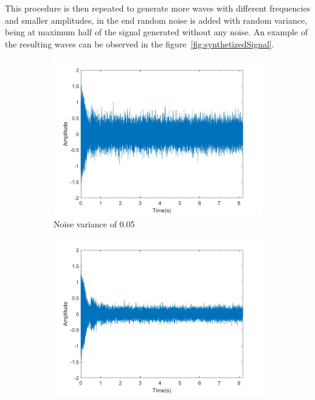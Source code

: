 This procedure is then repeated to generate more waves with different frequencies and smaller amplitudes, in the end random noise is added with random variance, being at maximum half of the signal generated without any noise. An example of the resulting waves can be observed in the figure~\ref{fig:synthetizedSignal}.
\begin{figure}[]
    \centering
    \begin{subfigure}{0.45\textwidth}
        \centering
        \includegraphics[width=\linewidth]{Chapters/6CHP/Figures/signal1.jpg}
        \caption{Noise variance of 0.05}{}
    \end{subfigure}
    \begin{subfigure}{0.45\textwidth}
        \centering
        \includegraphics[width=\linewidth]{Chapters/6CHP/Figures/signal2.jpg}

\end{subfigure}
\end{figure}
